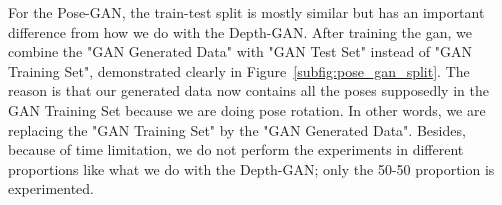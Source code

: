 For the Pose-GAN, the train-test split is mostly similar but has an important difference
from how we do with the Depth-GAN. After training the \acrshort{gan}, we combine the "GAN
Generated Data" with "GAN Test Set" instead of "GAN Training Set", demonstrated clearly in
Figure~\ref{subfig:pose_gan_split}. The reason is that our generated data now contains all
the poses supposedly in the GAN Training Set because we are doing pose rotation. In other
words, we are replacing the "GAN Training Set" by the "GAN Generated Data". Besides,
because of time limitation, we do not perform the experiments in different proportions like
what we do with the Depth-GAN; only the 50-50 proportion is experimented.

